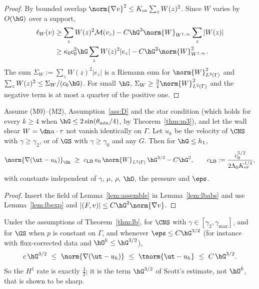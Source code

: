 \begin{proof}
By bounded overlap $\norm{\nabla v}^2\le K_{\mathrm{ov}}\sum_zW(z)^2$. Since $W$ varies by $O(\hG)$ over a support,
\begin{align*}
\ell_W(v)&\ge\sum_zW(z)^2\mathcal M(v_z)-C\hG^3\norm{W}_{W^{1,\infty}}\sum_z|W(z)|\\
&\ge\kappa_0c_0^2\hG\sum_zW(z)^2|e_z|-C\hG^2\norm{W}^2_{W^{1,\infty}} .
\end{align*}
The sum $\Sigma_W:=\sum_zW(z)^2|e_z|$ is a Riemann sum for $\norm{W}^2_{L^2(\Gamma)}$ and $\sum_zW(z)^2\le\Sigma_W/(c_0\hG)$. For small $\hG$, $\Sigma_W\ge\frac34\norm{W}^2_{L^2(\Gamma)}$ and the negative term is at most a quarter of the positive one.
\end{proof}

\begin{theorem}\label{thm:lb}
Assume (M0)--(M2), Assumption~\ref{ass:D} and the star condition (which holds for every $k\ge4$ when $\hG\le2\sin(\theta_{\min}/4)$, by Theorem~\ref{thm:m3}), and let the wall shear $W=\dn u\cdot\tau$ not vanish identically on $\Gamma$. Let $u_h$ be the velocity of $\CNS$ with $\gamma\ge\gamma_2$, or of $\GS$ with $\gamma\ge\gamma_0$ and any $G$. Then for $\hG\le h_1$,
\[
\norm{\nabla(\ut-u_h)}_{\Oh}\ \ge\ c_{\mathrm{LB}}\,\kappa_0\,\norm{W}_{L^2(\Gamma)}\,\hG^{3/2}-C\hG^{2},\qquad c_{\mathrm{LB}}:=\frac{c_0^{5/2}}{2\Lambda_0K_{\mathrm{ov}}^{1/2}},
\]
with constants independent of $\gamma$, $\mu$, $\rho$, $\hO$, the pressure and $\eps$.
\end{theorem}

\begin{proof}
Insert the field of Lemma~\ref{lem:assemble} in Lemma~\ref{lem:lbabs} and use Lemma~\ref{lem:lbexp} and $|(F,v)|\le C\hG^2\norm{\nabla v}$.
\end{proof}

\begin{corollary}\label{cor:sharp}
Under the assumptions of Theorem~\ref{thm:lb}, for $\CNS$ with $\gamma\in[\gamma_2,\gamma_{\max}]$, and for $\GS$ when $p$ is constant on $\Gamma$, and whenever $\eps\le C\hG^{3/2}$ (for instance with flux-corrected data and $\hO^k\le\hG^{3/2}$),
\[
c\,\hG^{3/2}\ \le\ \norm{\nabla(\ut-u_h)}\ \le\ \tnorm{\ut-u_h}\ \le\ C\,\hG^{3/2}.
\]
So the $H^1$ rate is exactly $\frac32$; it is the term $\hG^{3/2}$ of Scott's estimate, not $\hO^k$, that is shown to be sharp.
\end{corollary}

